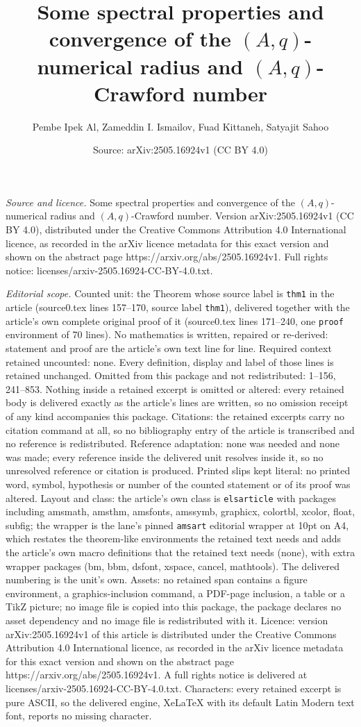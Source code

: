 \documentclass[10pt,a4paper]{amsart}
\title[Some spectral properties and convergence of the $ (A,q)$-num]{Some spectral properties and convergence of the $ (A,q)$-numerical radius and $ (A,q)$-Crawford number}
\author{Pembe Ipek Al, Zameddin I. Ismailov, Fuad Kittaneh, Satyajit Sahoo}
\date{Source: arXiv:2505.16924v1 (CC BY 4.0)}
\begin{document}
\maketitle

\noindent\emph{Source and licence.} Some spectral properties and convergence of the $ (A,q)$-numerical radius and $ (A,q)$-Crawford number. Version arXiv:2505.16924v1 (CC BY 4.0), distributed under the Creative Commons Attribution 4.0 International licence, as recorded in the arXiv licence metadata for this exact version and shown on the abstract page https://arxiv.org/abs/2505.16924v1. Full rights notice: licenses/arxiv-2505.16924-CC-BY-4.0.txt.\par\smallskip

\noindent\textit{Editorial scope.} Counted unit: the Theorem whose source label is \texttt{thm1} in the article (source0.tex lines 157--170, source label \texttt{thm1}), delivered together with the article's own complete original proof of it (source0.tex lines 171--240, one \texttt{proof} environment of 70 lines). No mathematics is written, repaired or re-derived: statement and proof are the article's own text line for line. Required context retained uncounted: none. Every definition, display and label of those lines is retained unchanged. Omitted from this package and not redistributed: 1--156, 241--853. Nothing inside a retained excerpt is omitted or altered: every retained body is delivered exactly as the article's lines are written, so no omission receipt of any kind accompanies this package. Citations: the retained excerpts carry no citation command at all, so no bibliography entry of the article is transcribed and no reference is redistributed. Reference adaptation: none was needed and none was made; every reference inside the delivered unit resolves inside it, so no unresolved reference or citation is produced. Printed slips kept literal: no printed word, symbol, hypothesis or number of the counted statement or of its proof was altered. Layout and class: the article's own class is \texttt{elsarticle} with packages including amsmath, amsthm, amsfonts, amssymb, graphicx, colortbl, xcolor, float, subfig; the wrapper is the lane's pinned \texttt{amsart} editorial wrapper at 10pt on A4, which restates the theorem-like environments the retained text needs and adds the article's own macro definitions that the retained text needs (none), with extra wrapper packages (bm, bbm, dsfont, xspace, cancel, mathtools). The delivered numbering is the unit's own. Assets: no retained span contains a figure environment, a graphics-inclusion command, a PDF-page inclusion, a table or a TikZ picture; no image file is copied into this package, the package declares no asset dependency and no image file is redistributed with it. Licence: version arXiv:2505.16924v1 of this article is distributed under the Creative Commons Attribution 4.0 International licence, as recorded in the arXiv licence metadata for this exact version and shown on the abstract page https://arxiv.org/abs/2505.16924v1. A full rights notice is delivered at licenses/arxiv-2505.16924-CC-BY-4.0.txt. Characters: every retained excerpt is pure ASCII, so the delivered engine, XeLaTeX with its default Latin Modern text font, reports no missing character.
\end{document}
